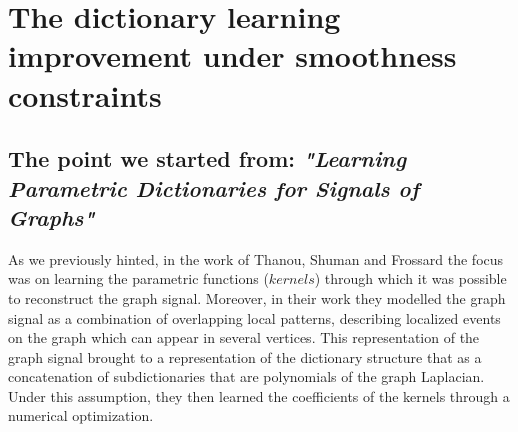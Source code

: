 \chapter{The dictionary learning improvement under smoothness constraints}
\label{sec:DL}
\section{The point we started from: \textit{"Learning Parametric Dictionaries for Signals of Graphs"}}
As we previously hinted, in the work of Thanou, Shuman and Frossard the focus was on learning the parametric functions ($kernels$) through which it was possible to reconstruct the graph signal. Moreover, in their work they modelled the graph signal as a combination of overlapping local patterns, describing localized events on the graph which can appear in several vertices. This representation of the graph signal brought to a representation of the dictionary structure that as a concatenation of subdictionaries that are polynomials of the graph Laplacian. Under this assumption, they then learned the coefficients of the kernels through a numerical optimization.

